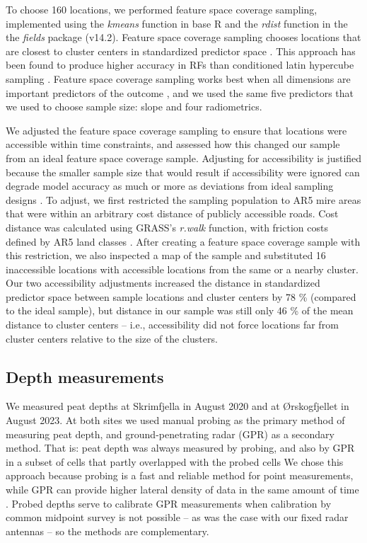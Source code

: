 \documentclass[soil, manuscript]{copernicus}
\begin{document}
To choose 160 locations, we performed feature space coverage sampling, implemented using the \emph{kmeans} function in base R and the \emph{rdist} function in the the \emph{fields} package (v14.2).
Feature space coverage sampling chooses locations that are closest to cluster centers in standardized predictor space \citep{brusSamplingDigitalSoil2019}.
This approach has been found to produce higher accuracy in RFs than conditioned latin hypercube sampling \citep{wadouxSamplingDesignOptimization2019, maComparisonConditionedLatin2020}.
Feature space coverage sampling works best when all dimensions are important predictors of the outcome \citep{wadouxSamplingDesignOptimization2019}, and we used the same five predictors that we used to choose sample size: slope and four radiometrics.

We adjusted the feature space coverage sampling to ensure that locations were accessible within time constraints, and assessed how this changed our sample from an ideal feature space coverage sample.
Adjusting for accessibility is justified because the smaller sample size that would result if accessibility were ignored can degrade model accuracy as much or more as deviations from ideal sampling designs \citep{wadouxSamplingDesignOptimization2019, maComparisonConditionedLatin2020}.
To adjust, we first restricted the sampling population to AR5 mire areas that were within an arbitrary cost distance of publicly accessible roads.
Cost distance was calculated using GRASS's \emph{r.walk} function, with friction costs defined by AR5 land classes \citep{GRASSv8-2}.
After creating a feature space coverage sample with this restriction, we also inspected a map of the sample and substituted 16 inaccessible locations with accessible locations from the same or a nearby cluster.
Our two accessibility adjustments increased the distance in standardized predictor space between sample locations and cluster centers by 78 \% (compared to the ideal sample), but distance in our sample was still only 46 \% of the mean distance to cluster centers -- i.e., accessibility did not force locations far from cluster centers relative to the size of the clusters.

\subsection{Depth measurements}

We measured peat depths at Skrimfjella in August 2020 and at Ørskogfjellet in August 2023.
At both sites we used manual probing as the primary method of measuring peat depth, and ground-penetrating radar (GPR) as a secondary method.
That is: peat depth was always measured by probing, and also by GPR in a subset of cells that partly overlapped with the probed cells
We chose this approach because probing is a fast and reliable method for point measurements, while GPR can provide higher lateral density of data in the same amount of time \citep{parryEvaluatingApproachesEstimating2014}.
Probed depths serve to calibrate GPR measurements when calibration by common midpoint survey is not possible -- as was the case with our fixed radar antennas -- so the methods are complementary.
\end{document}
